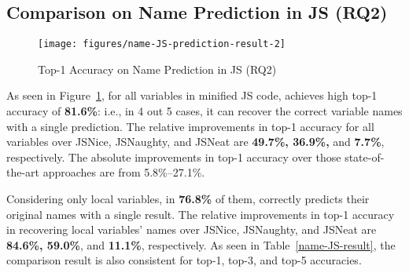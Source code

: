 \subsection{{\bf Comparison on Name Prediction in JS (RQ2)}}
\label{empirical-rq-js}

\begin{figure}[t] %
\begin{center}
\texttt{[image: figures/name-JS-prediction-result-2]} %
\vspace{-8pt}
\caption{Top-1 Accuracy on Name Prediction in JS (RQ2)}
\label{name-JS-prediction-result}
\end{center}
\end{figure}

As seen in Figure~\ref{name-JS-prediction-result}, for all variables in
minified JS code, {\tool} achieves high top-1 accuracy of {\bf 81.6\%}:
i.e., in 4 out 5 cases, it can recover the correct variable names
with a single prediction. The relative improvements in top-1 accuracy
for all variables over JSNice, JSNaughty, and JSNeat are
{\bf 49.7\%, 36.9\%,} and {\bf 7.7\%},
respectively.  The absolute improvements in top-1 accuracy over those
state-of-the-art approaches are from 5.8\%--27.1\%.

Considering only local variables, in
{\bf 76.8\%} of them, {\tool} correctly predicts their original names
with a single result. The relative improvements in top-1 accuracy in
recovering local variables' names over JSNice, JSNaughty, and JSNeat
are
{\bf 84.6\%, 59.0\%}, and {\bf 11.1\%}, respectively.  As seen in
Table~\ref{name-JS-result}, the comparison result is also consistent
for top-1, top-3, and top-5 accuracies.


